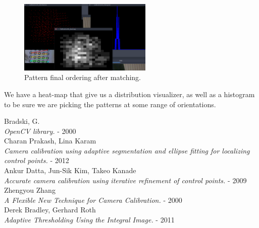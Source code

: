 \documentclass[journal]{IEEEtran}
\begin{document}
\begin{figure}[H]
\centering
\includegraphics[width=2.5in]{_img/tools.png}
\caption{Pattern final ordering after matching.}
\end{figure}

We have a heat-map that give us a distribution visualizer, as well as a histogram to be sure we are picking the patterns at some range of orientations. 


\begin{thebibliography}{1}

  Bradski, G. \\
  \textit{OpenCV library.} - 2000
\\
  Charan Prakash, Lina Karam\\
  \textit{Camera calibration using adaptive segmentation and ellipse fitting for localizing control points.} - 2012
\\
  Ankur Datta, Jun-Sik Kim, Takeo Kanade\\
  \textit{Accurate camera calibration using iterative refinement of control points.} - 2009
\\
  Zhengyou Zhang \\
  \textit{A Flexible New Technique for Camera Calibration.} - 2000
\\
  Derek Bradley, Gerhard Roth \\
  \textit{Adaptive Thresholding Using the Integral Image.} - 2011

\end{thebibliography}
\end{document}
